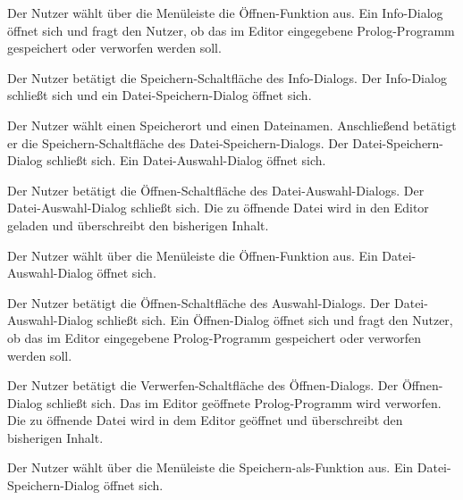 \documentclass[parskip=full,11pt,twoside]{scrartcl}
\begin{document}
{Der Nutzer wählt über die Menüleiste die Öffnen-Funktion aus.}
{Ein Info-Dialog öffnet sich und fragt den Nutzer, ob das im Editor eingegebene Prolog-Programm gespeichert oder verworfen werden soll.}

{Der Nutzer betätigt die Speichern-Schaltfläche des Info-Dialogs.}
{Der Info-Dialog schließt sich und ein Datei-Speichern-Dialog öffnet sich.}

{Der Nutzer wählt einen Speicherort und einen Dateinamen. Anschließend betätigt er die Speichern-Schaltfläche des Datei-Speichern-Dialogs.}
{Der Datei-Speichern-Dialog schließt sich. Ein Datei-Auswahl-Dialog öffnet sich.}

{Der Nutzer betätigt die Öffnen-Schaltfläche des Datei-Auswahl-Dialogs.}
{Der Datei-Auswahl-Dialog schließt sich. Die zu öffnende Datei wird in den Editor geladen und überschreibt den bisherigen Inhalt.}


{Der Nutzer wählt über die Menüleiste die Öffnen-Funktion aus.}
{Ein Datei-Auswahl-Dialog öffnet sich.}

{Der Nutzer betätigt die Öffnen-Schaltfläche des Auswahl-Dialogs.}
{Der Datei-Auswahl-Dialog schließt sich. Ein Öffnen-Dialog öffnet sich und fragt den Nutzer, ob das im Editor eingegebene Prolog-Programm gespeichert oder verworfen werden soll.}

{Der Nutzer betätigt die Verwerfen-Schaltfläche des Öffnen-Dialogs.}
{Der Öffnen-Dialog schließt sich. Das im Editor geöffnete Prolog-Programm wird verworfen. Die zu öffnende Datei wird in dem Editor geöffnet und überschreibt den bisherigen Inhalt.}


{Der Nutzer wählt über die Menüleiste die Speichern-als-Funktion aus.}
{Ein Datei-Speichern-Dialog öffnet sich.}
\end{document}
